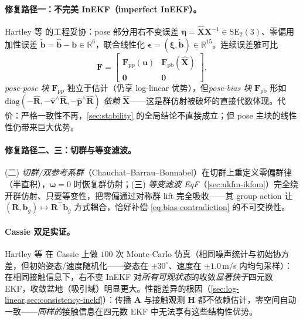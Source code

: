 \paragraph{修复路径一：不完美 InEKF（imperfect InEKF）。}Hartley 等\cite{hartley2020contact} 的工程妥协：pose 部分用右不变误差 $\boldsymbol{\eta}=\hat{\mathbf{X}}\mathbf{X}^{-1}\in\mathrm{SE}_2(3)$、零偏用加性误差 $\tilde{\mathbf{b}}=\hat{\mathbf{b}}-\mathbf{b}\in\mathbb{R}^6$，联合线性化 $\boldsymbol{\epsilon}=(\boldsymbol{\xi},\tilde{\mathbf{b}})\in\mathbb{R}^{15}$。连续误差雅可比
\begin{equation}
  \mathbf{F}=\begin{bmatrix}\mathbf{F}_{\mathrm{pp}}(\mathbf{u})&\mathbf{F}_{\mathrm{pb}}(\hat{\mathbf{X}})\\\mathbf{0}&\mathbf{0}\end{bmatrix},
  \label{eq:imperfect-F}
\end{equation}
\emph{pose-pose 块} $\mathbf{F}_{\mathrm{pp}}$ 独立于估计（仍享 log-linear 优势），但\emph{pose-bias 块} $\mathbf{F}_{\mathrm{pb}}$ 形如 $\mathrm{diag}(-\hat{\mathbf{R}},-\hat{\mathbf{v}}^\wedge\hat{\mathbf{R}},-\hat{\mathbf{p}}^\wedge\hat{\mathbf{R}})$ \emph{依赖} $\hat{\mathbf{X}}$——这是群仿射被破坏的直接代数体现。代价：严格一致性不再，\cref{sec:stability} 的全局结论不直接成立；但 pose 主块的线性性仍带来巨大优势。

\paragraph{修复路径二、三：切群与等变滤波。}(二) \emph{切群/双参考系群}（Chauchat--Barrau--Bonnabel\cite{chauchat2022tangent}）在切群上重定义零偏群律（半直积），$\boldsymbol{\omega}=0$ 时恢复群仿射；(三) \emph{等变滤波 EqF}（\cref{sec:ukfm-ikfom}）完全绕开群仿射、只要等变性，把零偏通过对称群 lift 完全吸收——其 group action 让 $(\mathbf{R},\mathbf{b}_g)\mapsto\mathbf{R}^\top\mathbf{b}_g$ 方式耦合，恰好补偿 \cref{eq:bias-contradiction} 的不可交换性\cite{fornasier2022overcoming}。

\paragraph{Cassie 双足实证。}Hartley 等\cite{hartley2020contact} 在 Cassie 上做 $100$ 次 Monte-Carlo 仿真（相同噪声统计与初始协方差，但初始姿态/速度随机化——姿态在 $\pm30^\circ$、速度在 $\pm1.0\,$m/s 内均匀采样）：在相同接触信息下，右不变 InEKF 对\emph{所有可观状态}的收敛\emph{显著快于}四元数 EKF，收敛盆地（吸引域）明显更大。性能差异的根因（\cref{sec:log-linear,sec:consistency-inekf}）：传播 $\mathbf{A}$ 与接触观测 $\mathbf{H}$ 都不依赖估计，零空间自动一致——\emph{同样的}接触信息在四元数 EKF 中无法享有这些结构性优势。

